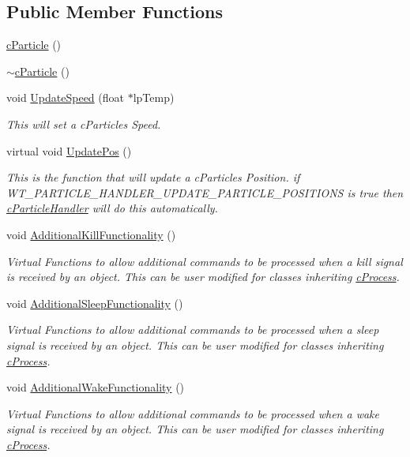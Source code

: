 \subsection*{Public Member Functions}
\begin{DoxyCompactItemize}
\item 
\hyperlink{classc_particle_abbf099a6fa7cb1b9f4ea06391b3a0cd8}{cParticle} ()
\item 
\hyperlink{classc_particle_aa77cb241d5a6cdb63ecd4203d0abadb6}{$\sim$cParticle} ()
\item 
void \hyperlink{classc_particle_a208780eb109c709449a2edd3f7867e51}{UpdateSpeed} (float $\ast$lpTemp)
\begin{DoxyCompactList}\small\item\em This will set a cParticles Speed. \item\end{DoxyCompactList}\item 
virtual void \hyperlink{classc_particle_a029fe14e7b4a67e6a7864b86772b283b}{UpdatePos} ()
\begin{DoxyCompactList}\small\item\em This is the function that will update a cParticles Position. if WT\_\-PARTICLE\_\-HANDLER\_\-UPDATE\_\-PARTICLE\_\-POSITIONS is true then \hyperlink{classc_particle_handler}{cParticleHandler} will do this automatically. \item\end{DoxyCompactList}\item 
void \hyperlink{classc_particle_a56f58d6b6ce25a544c252f54fccd1445}{AdditionalKillFunctionality} ()
\begin{DoxyCompactList}\small\item\em Virtual Functions to allow additional commands to be processed when a kill signal is received by an object. This can be user modified for classes inheriting \hyperlink{classc_process}{cProcess}. \item\end{DoxyCompactList}\item 
void \hyperlink{classc_particle_ae3b8183f12164033d6fddd81b1f33d7b}{AdditionalSleepFunctionality} ()
\begin{DoxyCompactList}\small\item\em Virtual Functions to allow additional commands to be processed when a sleep signal is received by an object. This can be user modified for classes inheriting \hyperlink{classc_process}{cProcess}. \item\end{DoxyCompactList}\item 
void \hyperlink{classc_particle_a52ccd8d113be2829771155c14f447507}{AdditionalWakeFunctionality} ()
\begin{DoxyCompactList}\small\item\em Virtual Functions to allow additional commands to be processed when a wake signal is received by an object. This can be user modified for classes inheriting \hyperlink{classc_process}{cProcess}. \item\end{DoxyCompactList}\end{DoxyCompactItemize}



